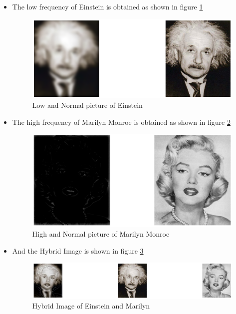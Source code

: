\documentclass[a4paper,12pt]{article}
\begin{document}
	\begin{itemize}
		\item The low frequency of Einstein is obtained as shown in figure \ref{fig:pipe_ein}
			\begin{figure}[h!]
				\centering
				\includegraphics[width=0.75\linewidth]{images/low_pipe_ein}
				\caption{Low and Normal picture of Einstein}
				\label{fig:pipe_ein}
			\end{figure}
		\item The high frequency of Marilyn Monroe is obtained as shown in figure \ref{fig:pipe_mar}
			\begin{figure}[h!]
				\centering
				\includegraphics[width=0.75\linewidth]{images/high_mar_pipe}
				\caption{High and Normal picture of Marilyn Monroe}
				\label{fig:pipe_mar}
			\end{figure}
		\item And the Hybrid Image is shown in figure \ref{fig:conco}
			\begin{figure}[h!]
				\centering
				\includegraphics[width=0.75\linewidth]{images/convolved}
				\caption{Hybrid Image of Einstein and Marilyn}
				\label{fig:conco}
			\end{figure}
	\end{itemize}
\end{document}

